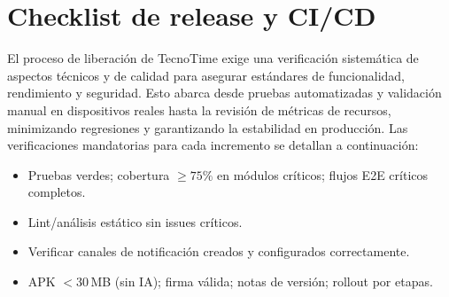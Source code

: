 \section{Checklist de release y CI/CD}
El proceso de liberación de TecnoTime exige una verificación sistemática de aspectos técnicos y de calidad para asegurar estándares de funcionalidad, rendimiento y seguridad. Esto abarca desde pruebas automatizadas y validación manual en dispositivos reales hasta la revisión de métricas de recursos, minimizando regresiones y garantizando la estabilidad en producción. Las verificaciones mandatorias para cada incremento se detallan a continuación:

\begin{itemize}
  \item Pruebas verdes; cobertura $\geq 75\%$ en módulos críticos; flujos E2E críticos completos.
  \item Lint/análisis estático sin issues críticos.
  \item Verificar canales de notificación creados y configurados correctamente.
  \item APK $<30$\,MB (sin IA); firma válida; notas de versión; rollout por etapas.
\end{itemize}
